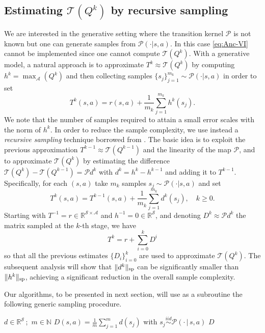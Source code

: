 \documentclass{article}
\newcommand{\cA}{\mathcal{A}}
\newcommand{\cS}{\mathcal{S}}
\newcommand{\cP}{\mathcal{P} }
\newcommand{\T}{\mathcal{T}}
\newcommand{\real}{\mathbb{R}}
\newcommand{\reals}{\mathbb{R}}
\renewcommand{\sp}[1]{\|{#1}\|_\text{\rm sp}}
\newcommand{\maxA}{\mbox{$\max_\cA$}}
\newcommand{\R}{r}
\theoremstyle{plain}
\theoremstyle{definition}
\theoremstyle{remark}
\begin{document}
\subsection{Estimating $\T(Q^{k})$ by recursive sampling}
We are interested in the generative setting where the transition kernel $\cP$ is not known but one can generate samples from $\cP(\cdot|s,a)$. In this case \eqref{eq:Anc-VI} cannot be implemented since one cannot compute $\T(Q^{k})$. With a generative model, a natural approach is to approximate $T^{k}\approx \T(Q^{k})$ by computing $h^k=\maxA(Q^k)$ and then collecting samples $\{s_j\}_{j=1}^{m_k}\sim \cP(\cdot|s,a)$  in order to set
$$\mbox{$T^k(s,a)=\R(s,a)+\frac{1}{m_k}\sum_{j=1}^{m_k}h^k(s_j)$}.$$ 
We note that the number of samples required to attain a small error scales with the norm of $h^k$. In order to reduce the sample complexity, we use instead a \emph{recursive sampling} technique borrowed from \citet{jin2024truncated}. 
The basic idea is to exploit the previous approximation $T^{k-1}\approx \T(Q^{k-1})$ and the linearity of the map $\cP$, and to approximate $\T(Q^{k})$ by estimating the difference $\T(Q^{k})-\T(Q^{k-1})=\cP d^k$ with  $d^k=h^k-h^{k-1}$ and adding it to $T^{k-1}$. Specifically, for each $(s,a)$ take $m_k$ samples $s_j\sim\cP(\cdot|s,a)$ and set
$$T^{k}(s,a)=T^{k-1}(s,a)+\mbox{$\frac{1}{m_k}\sum_{j=1}^{m_k}d^k(s_j), \quad k\geq 0$}.$$
 Starting with $T^{-1}=\R\in\reals^{\cS\times\cA}$ and $h^{-1}=0\in\reals^\cS$, and
denoting $D^k\approx\cP d^k$ the matrix sampled at the $k$-th stage, 
we have 
\begin{equation}\label{Eq:telescope}
    \mbox{$T^k=\R+\sum_{i=0}^k D^i$}
\end{equation}
so that all the previous estimates $\{D_i\}^k_{i=0}$ are used to approximate  $\T(Q^{k})$. The subsequent analysis will show that $\sp{d^k}$ can be  significantly smaller than $\sp{h^k}$, achieving a significant reduction in the overall sample complexity.

Our algorithms, to be presented in next section, will use as a subroutine the following generic sampling procedure.
\begin{algorithm}[ht!]
   \caption{\mbox{\sc sample}$(d, m)$}
   \label{alg:sample}
\begin{algorithmic}
   $d \in \real^{\cS}$\,;\, $m \in \mathbb{N}$
   \FOR{ $(s,a) \in \cS \times \cA$}
   \STATE $D(s,a)=\frac{1}{m}\sum_{j=1}^m d (s_j)$ with $s_j \stackrel{iid}{\sim} \cP(\cdot \,|\, s,a)$
   \ENDFOR
  $D$
\end{algorithmic}
\end{algorithm}
\end{document}
